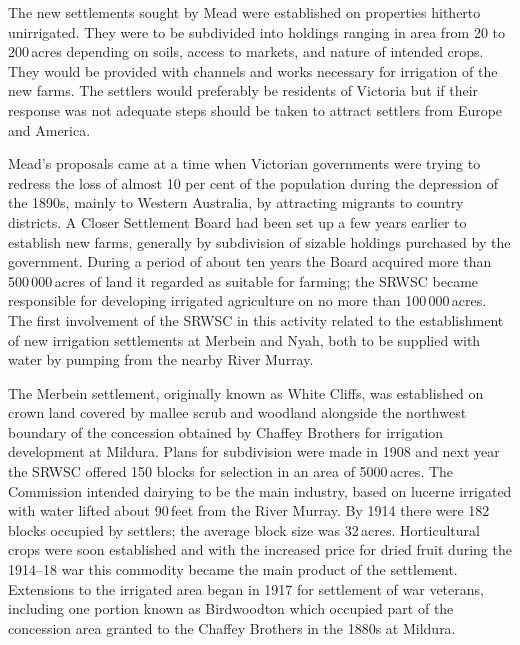 The new settlements sought by Mead were established on properties
hitherto unirrigated. They were to be subdivided into holdings ranging
in area from 20 to 200\,acres depending on soils, access to markets, and
nature of intended crops.  They would be provided with channels and
works necessary for irrigation of the new farms.  The settlers would
preferably be residents of Victoria but if their response was not
adequate steps should be taken to attract settlers from Europe and
America.

Mead's proposals came at a time when Victorian governments were trying
to redress the loss of almost 10 per cent of the population during the
depression of the 1890s, mainly to Western Australia, by attracting
migrants to country districts.  A Closer Settlement Board had been set
up a few years earlier to establish new farms, generally by
subdivision of sizable holdings purchased by the government.  During a
period of about ten years the Board acquired more than 500\,000\,acres of
land it regarded as suitable for farming; the SRWSC became responsible
for developing irrigated agriculture on no more than 100\,000\,acres.
The first involvement of the SRWSC in this activity related to the
establishment of new irrigation settlements at Merbein and Nyah, both
to be supplied with water by pumping from the nearby River
Murray.

The Merbein settlement, originally known as White Cliffs, was
established on crown land covered by mallee scrub and woodland
alongside the northwest boundary of the concession obtained by Chaffey
Brothers for irrigation development at Mildura.  Plans for subdivision
were made in 1908 and next year the SRWSC offered 150 blocks for
selection in an area of 5000\,acres.  The Commission intended dairying
to be the main industry, based on lucerne irrigated with water lifted
about 90\,feet from the River Murray.  By 1914 there were 182 blocks
occupied by settlers; the average block size was 32\,acres.
Horticultural crops were soon established and with the increased price
for dried fruit during the 1914--18 war this commodity became the main
product of the settlement.  Extensions to the irrigated area began in
1917 for settlement of war veterans, including one portion known as
Birdwoodton which occupied part of the concession area granted to the
Chaffey Brothers in the 1880s at Mildura.

